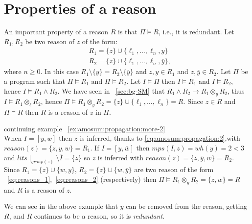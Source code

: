 \section{Properties of a reason}
\label{sec:properties_reason}
An important property of a reason $R$ is that $\Pi \models R$, i.e., 
it is redundant.
Let $R_1,R_2$ be two reason of $z$ of the form:
\begin{align}
    \label{eq:reasons_1}
    &R_1 = \{z\} \cup \{\ell_1, \hdots, \ell_n, y\} \\ 
    \label{eq:reasons_2}
    &R_2 = \{z\} \cup \{\ell_1, \hdots, \ell_n, \overline{y}\}, 
\end{align}
where $n \ge 0$.
In this case $R_1 \setminus \{y\} = R_2 \setminus \{\overline{y}\}$ and $z,y \in R_1$ and 
$z,\overline{y} \in R_2$.
Let $\Pi$ be a program such that $\Pi \models R_1$ and $\Pi \models R_2$.
Let $I \models \Pi$ then $I \models R_1$ and $I \models R_2$, hence $I \models R_1 \land R_2$.
We have seen in ~\ref{sec:bg-SM} that 
$R_1 \land R_2 \rightarrow R_1 \otimes_{y} R_2$, thus $I \models  R_1 \otimes_{\ell} R_2$,
hence $\Pi \models R_1 \otimes_{y} R_2 = \{z\} \cup \{\ell_1, \hdots, \ell_n\} = R$.
Since $z \in R$ and $\Pi \models R$ then $R$ is a reason of $z$ in $\Pi$.
\begin{example} continuing example ~\ref{ex:amosum:propagation:more-2}\\
    When $I = [\overline{y}, \overline{w}]$ then $z$ is inferred,
    thanks to \eqref{eq:amosum:propagation:2},with $\mathit{reason}(z) = \{z,y,w\} = R_1$.
    If $I = [y, \overline{w}]$ then $mps(I,z) = \mathit{wh}(y) = 2 < 3$ and 
    $lits\mid_{group(z)} \setminus \overline{I} = \{z\}$ so $z$ is inferred 
    with $\mathit{reason}(z) = \{z,\overline{y},w\} = R_2$.
    Since $R_1 = \{z\} \cup \{w,y\}$,
    $R_2 = \{z\} \cup \{w,\overline{y}\}$
    are two reason of the form ~\ref{eq:reasons_1},~\ref{eq:reasons_2} (respectively) then 
    $\Pi \models R_1 \otimes_{y} R_2 = \{z,w\} = R$ and $R$ is a reason of $z$.
\end{example}
We can see in the above example that $y$ can be removed from the reason, getting $R$,
and $R$ continues to be a reason, so it is \textit{redundant}.

